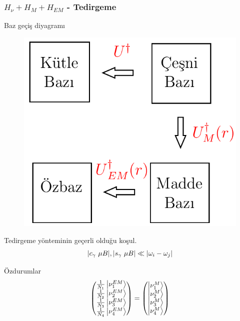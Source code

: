 \documentclass[10pt]{beamer}
\begin{document}
\begin{frame}
    \frametitle{$H_{\nu}+ H_{M}+ H_{EM}$ - Tedirgeme}
    \begin{minipage}{0.45\textwidth}
        Baz geçiş diyagramı
        \begin{figure}[hbt!]
            \centering
            \includegraphics[width=.9\textwidth]{fig/tedirgemeDiagram.png}
        \end{figure}
        Tedirgeme yönteminin geçerli olduğu koşul.
        \begin{equation*}
            \abs{c_{\gamma}~\mu B}, \abs{s_{\gamma}~\mu B}  \ll \abs{\omega_{i}-\omega_{j}}
        \end{equation*}
    \end{minipage}
    \hfill
    \begin{minipage}{0.45\textwidth}
        \color{lightgray}
        Özdurumlar
        \tiny
        \begin{equation*}
            \mqty(
                \frac{1}{N_{1}}\ket{\nu^{EM}_{1}}\\
                \frac{1}{N_{2}}\ket{\nu^{EM}_{2}}\\
                \frac{1}{N_{3}}\ket{\nu^{EM}_{3}}\\
                \frac{1}{N_{4}}\ket{\nu^{EM}_{4}}) =
            \mqty(
                \ket{\nu^{M}_{1}}\\
                \ket{\nu^{M}_{2}}\\
                \ket{\nu^{M}_{3}}\\
                \ket{\nu^{M}_{4}})

\end{equation*}
\end{minipage}
\end{frame}
\end{document}
